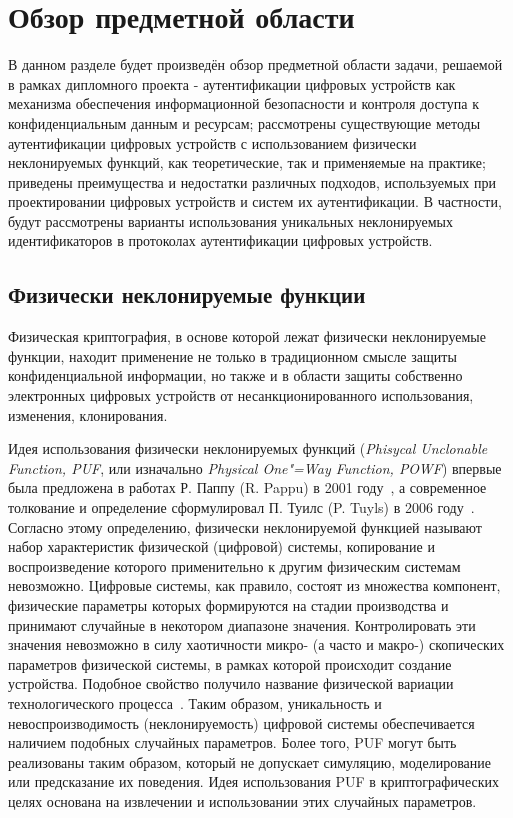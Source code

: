 \section{Обзор предметной области}
\label{sec:domain:intro}

В данном разделе будет произведён обзор предметной области задачи, решаемой в рамках дипломного проекта - аутентификации цифровых устройств как механизма обеспечения информационной безопасности и контроля доступа к конфиденциальным данным и ресурсам; рассмотрены существующие методы аутентификации цифровых устройств с использованием физически неклонируемых функций, как теоретические, так и применяемые на практике; приведены преимущества и недостатки различных подходов, используемых при проектировании цифровых устройств и систем их аутентификации.
В частности, будут рассмотрены варианты использования уникальных неклонируемых идентификаторов в протоколах аутентификации цифровых устройств.

\subsection{Физически неклонируемые функции}
\label{sub:domain:pufs}
Физическая криптография, в основе которой лежат физически неклонируемые функции, находит применение не только в традиционном смысле защиты конфиденциальной информации, но также и в области защиты собственно электронных цифровых устройств от несанкционированного использования, изменения, клонирования.

Идея использования физически неклонируемых функций (\emph{Phisycal Unclonable Function, PUF}, или изначально \emph{Physical One"=Way Function, POWF}) впервые была предложена в работах Р. Паппу (R. Pappu) в 2001 году~\cite{rpappu_powf}, а современное толкование и определение сформулировал П. Туилс (P. Tuyls) в 2006 году~\cite{ptuyls_pufs}. Согласно этому определению, физически неклонируемой функцией называют набор характеристик физической (цифровой) системы, копирование и воспроизведение которого применительно к другим физическим системам невозможно. Цифровые системы, как правило, состоят из множества компонент, физические параметры которых формируются на стадии производства и принимают случайные в некотором диапазоне значения. Контролировать эти значения невозможно в силу хаотичности микро- (а часто и макро-) скопических параметров физической системы, в рамках которой происходит создание устройства. Подобное свойство получило название физической вариации технологического процесса~\cite{ivaniuk_pufs}. Таким образом, уникальность и невоспроизводимость (неклонируемость) цифровой системы обеспечивается наличием подобных случайных параметров. Более того, PUF могут быть реализованы таким образом, который не допускает симуляцию, моделирование или предсказание их поведения. Идея использования PUF в криптографических целях основана на извлечении и использовании этих случайных параметров.


